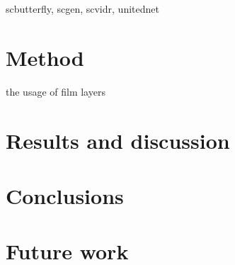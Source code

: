 \documentclass[12pt, a4paper]{report}
\begin{document}
scbutterfly, scgen, scvidr, unitednet

\section{Method}

the usage of film layers

\section{Results and discussion}

\section{Conclusions}

\section{Future work}




\appendix





\end{document}
